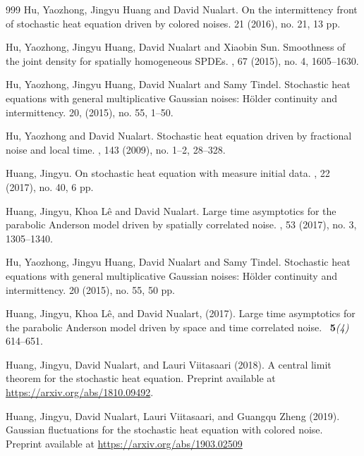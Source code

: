 \documentclass[a4paper,12pt]{article}
\theoremstyle{plain}
\theoremstyle{definition}
\begin{document}
\begin{thebibliography}{999}
Hu, Yaozhong, Jingyu Huang and David Nualart. 
\newblock On the intermittency front of stochastic heat equation driven by colored noises. 
 21 (2016), no. 21, 13 pp.

Hu, Yaozhong, Jingyu Huang, David Nualart and Xiaobin Sun.
\newblock Smoothness of the joint density for spatially homogeneous SPDEs.
,  67 (2015), no. 4, 1605--1630.


Hu, Yaozhong, Jingyu Huang, David Nualart and Samy Tindel.
\newblock Stochastic heat equations with general multiplicative Gaussian noises:
H\"older continuity and intermittency.
  20, (2015), no. 55, 1--50.


Hu, Yaozhong and David Nualart.
\newblock Stochastic heat equation driven by fractional noise and local time.
, 143 (2009), no. 1--2, 28--328.


Huang, Jingyu.
\newblock On stochastic heat equation with measure initial data.
, 22 (2017), no. 40, 6 pp.

Huang, Jingyu, Khoa L\^e and David Nualart.
\newblock Large time asymptotics for the parabolic Anderson model driven by spatially correlated noise.
, 53 (2017), no. 3, 1305--1340. 

Hu, Yaozhong, Jingyu Huang, David Nualart and Samy Tindel.
\newblock Stochastic heat equations with general multiplicative Gaussian noises:
H\"older continuity and intermittency.
 20 (2015), no. 55, 50 pp.

Huang, Jingyu, Khoa L\^e, and David Nualart, (2017).
\newblock Large time asymptotics for the parabolic Anderson model driven by space and time correlated noise.
\ {\bf 5}{\it (4)} 614--651.

Huang, Jingyu, David Nualart, and Lauri Viitasaari (2018).
A central limit theorem for the stochastic heat equation.
Preprint available at \url{https://arxiv.org/abs/1810.09492}.

Huang, Jingyu, David Nualart, Lauri Viitasaari, and Guangqu Zheng (2019).
Gaussian fluctuations for the stochastic heat equation with colored noise.
Preprint available at \url{https://arxiv.org/abs/1903.02509}
	

\end{thebibliography}
\end{document}
